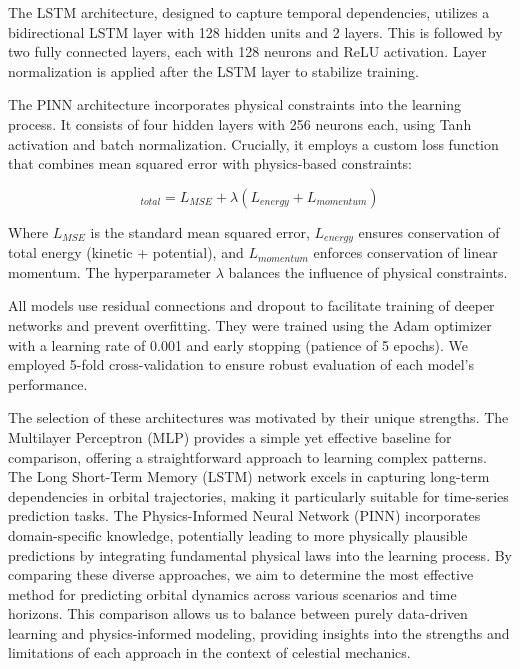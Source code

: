 \documentclass[11pt,a4paper, twocolumn]{article}
\begin{document}
The LSTM architecture, designed to capture temporal dependencies, utilizes a bidirectional LSTM layer with 128 hidden units and 2 layers. This is followed by two fully connected layers, each with 128 neurons and ReLU activation. Layer normalization is applied after the LSTM layer to stabilize training.

The PINN architecture incorporates physical constraints into the learning process. It consists of four hidden layers with 256 neurons each, using Tanh activation and batch normalization. Crucially, it employs a custom loss function that combines mean squared error with physics-based constraints:

\begin{equation}
_{total} = L_{MSE} + \lambda(L_{energy} + L_{momentum})
\end{equation}

Where $L_{MSE}$ is the standard mean squared error, $L_{energy}$ ensures conservation of total energy (kinetic + potential), and $L_{momentum}$ enforces conservation of linear momentum. The hyperparameter $\lambda$ balances the influence of physical constraints.

All models use residual connections and dropout to facilitate training of deeper networks and prevent overfitting. They were trained using the Adam optimizer with a learning rate of 0.001 and early stopping (patience of 5 epochs). We employed 5-fold cross-validation to ensure robust evaluation of each model's performance.

The selection of these architectures was motivated by their unique strengths. The Multilayer Perceptron (MLP) provides a simple yet effective baseline for comparison, offering a straightforward approach to learning complex patterns. The Long Short-Term Memory (LSTM) network excels in capturing long-term dependencies in orbital trajectories, making it particularly suitable for time-series prediction tasks. The Physics-Informed Neural Network (PINN) incorporates domain-specific knowledge, potentially leading to more physically plausible predictions by integrating fundamental physical laws into the learning process. By comparing these diverse approaches, we aim to determine the most effective method for predicting orbital dynamics across various scenarios and time horizons. This comparison allows us to balance between purely data-driven learning and physics-informed modeling, providing insights into the strengths and limitations of each approach in the context of celestial mechanics.
\end{document}
